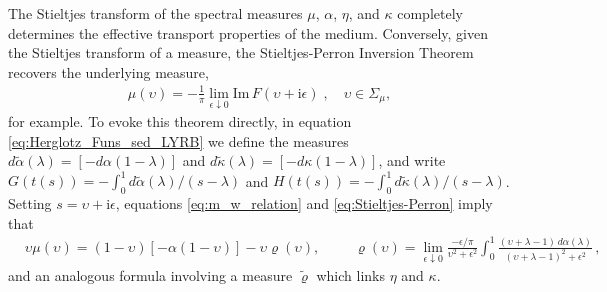 \documentclass[english,12pt,jmp,graphicx]{revtex4-1}
\newcommand{\I}{\mathrm{i}}
\begin{document}
The Stieltjes transform of the spectral measures $\mu$, $\alpha$, $\eta$, and $\kappa$
completely determines the effective transport properties of the
medium. Conversely, given the Stieltjes transform of a measure, the
Stieltjes-Perron Inversion Theorem \cite{Henrici:1974:v3} recovers the
underlying measure, 
%
\begin{align}\label{eq:Stieltjes-Perron}
  \mu(\upsilon)=-\frac{1}{\pi}\lim_{\epsilon\downarrow0}\text{Im}\,F(\upsilon+\I\epsilon)\;, \quad
  \upsilon\in\Sigma_\mu, 
\end{align}
%
for example. To evoke this theorem directly, in equation
\eqref{eq:Herglotz_Funs_sed_LYRB} we define the measures
$d\tilde{\alpha}(\lambda)=[-d\alpha(1-\lambda)]$ and $d\tilde{\kappa}(\lambda)=[-d\kappa(1-\lambda)]$, and write
$G(t(s))=-\int_0^1d\tilde{\alpha}(\lambda)/(s-\lambda)$ and
$H(t(s))=-\int_0^1d\tilde{\kappa}(\lambda)/(s-\lambda)$. Setting $s=\upsilon+\I\epsilon$,
equations \eqref{eq:m_w_relation} and \eqref{eq:Stieltjes-Perron}
imply that  
\begin{align}\label{eq:BM_measure_relationship}
  &\upsilon\mu(\upsilon)=(1-\upsilon)[-\alpha(1-\upsilon)] - \upsilon\varrho(\upsilon), &&
  &\varrho(\upsilon)=%
       \lim_{\epsilon\downarrow 0}\frac{-\epsilon/\pi}{\upsilon^2+\epsilon^2}
         \int_0^1\frac{(\upsilon+\lambda-1)\,d\alpha(\lambda)}{(\upsilon+\lambda-1)^2+\epsilon^2}\,,&&
\end{align}
%
and an analogous formula involving a measure $\tilde{\varrho}$ which links
$\eta$ and $\kappa$.
\end{document}
